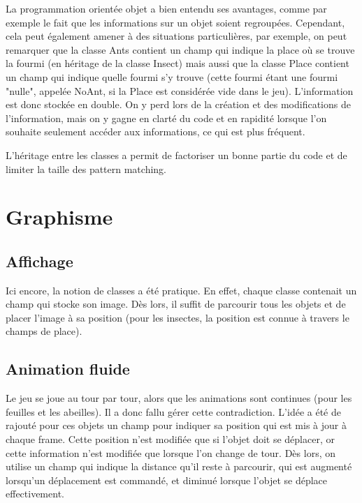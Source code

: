 \documentclass[10pt,a4paper]{article}
\begin{document}
La programmation orientée objet a bien entendu ses avantages, comme par exemple le fait que les informations sur un objet soient regroupées. Cependant, cela peut également amener à des situations particulières, par exemple, on peut remarquer que la classe Ants contient un champ qui indique la place où se trouve la fourmi (en héritage de la classe Insect) mais aussi que la classe Place contient un champ qui indique quelle fourmi s'y trouve (cette fourmi étant une fourmi "nulle", appelée NoAnt, si la Place est considérée vide dans le jeu). L'information est donc stockée en double. On y perd lors de la création et des modifications de l'information, mais on y gagne en clarté du code et en rapidité lorsque l'on souhaite seulement accéder aux informations, ce qui est plus fréquent.

L'héritage entre les classes a permit de factoriser un bonne partie du code et de limiter la taille des pattern matching.

\section{Graphisme}

\subsection{Affichage}

Ici encore, la notion de classes a été pratique. En effet, chaque classe contenait un champ qui stocke son image. Dès lors, il suffit de parcourir tous les objets et de placer l'image à sa position (pour les insectes, la position est connue à travers le champs de place). 

\subsection{Animation fluide}
  
Le jeu se joue au tour par tour, alors que les animations sont continues (pour les feuilles et les abeilles). Il a donc fallu gérer cette contradiction. L'idée a été de rajouté pour ces objets un champ pour indiquer sa position qui est mis à jour à chaque frame. Cette position n'est modifiée que si l'objet doit se déplacer, or cette information n'est modifiée que lorsque l'on change de tour. Dès lors, on utilise un champ qui indique la distance qu'il reste à parcourir, qui est augmenté lorsqu'un déplacement est commandé, et diminué lorsque l'objet se déplace effectivement.
\end{document}
